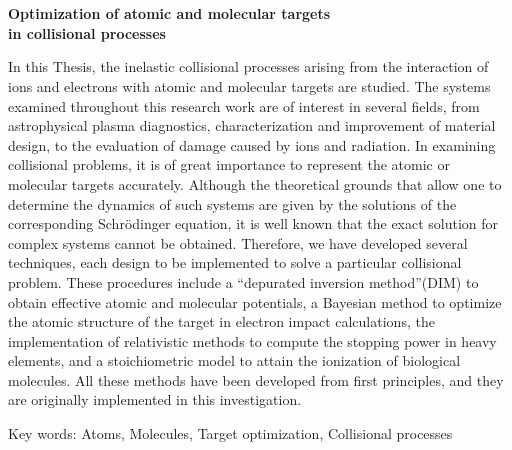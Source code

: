\chapter*{}%
%

\begin{center}
\begin{large}
\textbf{Optimization of atomic and molecular targets \\ in collisional processes}
\end{large}
\end{center}

\vspace{1cm}
In this Thesis, the inelastic collisional processes arising from the 
interaction of ions and electrons with atomic and molecular targets are 
studied. The systems examined throughout this research work are of 
interest in several fields, from astrophysical plasma diagnostics, 
characterization and improvement of material design, to the evaluation 
of damage caused by ions and radiation. In examining collisional 
problems, it is of great importance to represent the atomic or 
molecular targets accurately. Although the theoretical grounds that 
allow one to determine the dynamics of such systems are given by the 
solutions of the corresponding Schrödinger equation, it is well known 
that the exact solution for complex systems cannot be obtained. 
Therefore, we have developed several techniques, each design to be 
implemented to solve a particular collisional problem. These procedures 
include a “depurated inversion method”(DIM) to obtain effective atomic 
and molecular potentials, a Bayesian method to optimize the atomic 
structure of the target in electron impact calculations, the 
implementation of relativistic methods to compute the stopping power in 
heavy elements, and a stoichiometric model to attain the ionization of 
biological molecules. All these methods have been developed from first 
principles, and they are originally implemented in this investigation.

\vspace{1cm}
\noindent
Key words: 
Atoms, 
Molecules, 
Target optimization, 
Collisional processes

